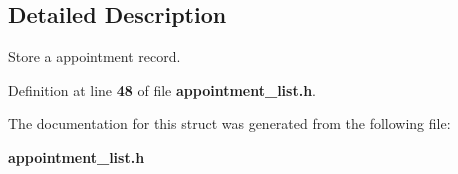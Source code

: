 \subsection{Detailed Description}
Store a appointment record. 

Definition at line {\bf 48} of file {\bf appointment\+\_\+list.\+h}.



The documentation for this struct was generated from the following file\+:\begin{DoxyCompactItemize}
\item 
{\bf appointment\+\_\+list.\+h}\end{DoxyCompactItemize}
